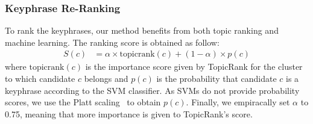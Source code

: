     \subsubsection{Keyphrase Re-Ranking}
    \label{subsubsec:keyphrase_reranking}
      To rank the keyphrases, our method benefits from both topic ranking and
      machine learning. The ranking score is obtained as follow:
      \begin{align}
        S(c) &= \alpha \times \text{topicrank}(c) + (1 - \alpha) \times p(c)
      \end{align}
      where $\text{topicrank}(c)$ is the importance score given by TopicRank for
      the cluster to which candidate $c$ belongs and $p(c)$ is the probability
      that candidate $c$ is a keyphrase according to the SVM classifier. As SVMs
      do not provide probability scores, we use the Platt
      scaling~\cite{platt1999probabilisticsvm} to obtain $p(c)$. Finally, we
      empiracally set $\alpha$ to 0.75, meaning that more importance is given to
      TopicRank's score.

